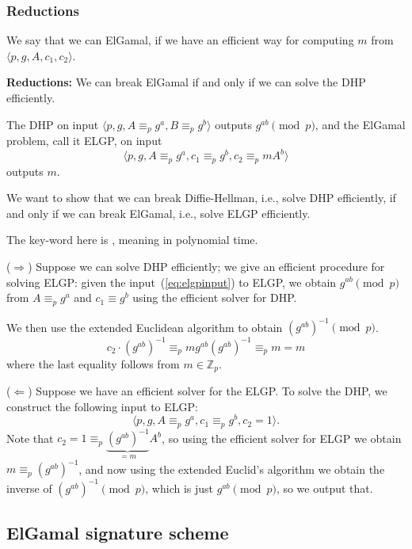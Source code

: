 \begin{frame}
\frametitle{Reductions}

We say that we can  ElGamal, if we have an efficient way for
computing $m$ from $\langle p,g,A,c_1,c_2\rangle$.  

{\bf Reductions:}
We can
break ElGamal if and only if we can solve the DHP efficiently.

The DHP on input $\langle p,g,A\equiv_p g^a,
B\equiv_p g^b\rangle$ outputs $g^{ab}\pmod p$, and the ElGamal problem,
call it ELGP, on input 
\begin{equation}\label{eq:elgpinput}
\langle p,g,A\equiv_p g^a, c_1\equiv_p g^b, c_2\equiv_p mA^b\rangle
\end{equation}
outputs $m$.  

We want to show that we can break Diffie-Hellman, i.e.,
solve DHP efficiently, if and only if we can break ElGamal, i.e.,
solve ELGP efficiently.  

The key-word here is ,
meaning in polynomial time.
\end{frame}

\begin{frame}
($\Rightarrow$)  Suppose we can solve DHP efficiently; we
give an efficient procedure for solving ELGP: given the
input~(\ref{eq:elgpinput}) to
ELGP, we obtain $g^{ab}\pmod p$ from 
$A\equiv_p g^a$ and $c_1\equiv g^b$
using the efficient solver for DHP.

We then use the extended Euclidean algorithm
to obtain $(g^{ab})^{-1}\pmod p$.
$$
c_2\cdot (g^{ab})^{-1}
\equiv_p mg^{ab}(g^{ab})^{-1}
\equiv_p m
=m
$$
where the last equality follows from $m\in\mathbb{Z}_p$.
\end{frame}

\begin{frame}
($\Leftarrow$) Suppose we have an efficient solver for the
ELGP.  To solve the DHP, we construct the following input to ELGP:
$$
\langle p,g,A\equiv_p g^a,c_1\equiv_p g^b,c_2=1\rangle.
$$
Note that $c_2=1\equiv_p\underbrace{(g^{ab})^{-1}}_{=m}A^b$, so using
the efficient solver for ELGP we obtain $m\equiv_p (g^{ab})^{-1}$, and
now using the extended Euclid's algorithm we obtain the inverse of
$(g^{ab})^{-1}\pmod p$, which is just $g^{ab}\pmod p$, so we output
that.
\end{frame}

\subsection{ElGamal signature scheme}

